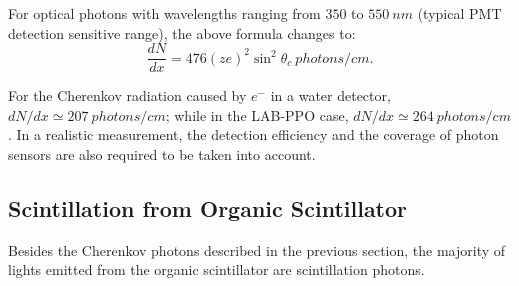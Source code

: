 For optical photons with wavelengths ranging from $350$ to $550~nm$ (typical PMT detection sensitive range), the above formula changes to\cite{leo2012techniques}:
\begin{equation}
\frac{dN}{dx}=476(ze)^2\sin^2\theta_c~photons/cm.
\end{equation}

For the Cherenkov radiation caused by $e^-$ in a water detector, $dN/dx \simeq 207~photons/cm$; while in the LAB-PPO case, $dN/dx \simeq 264~photons/cm$. In a realistic measurement, the detection efficiency and the coverage of photon sensors are also required to be taken into account.

\subsection{Scintillation from Organic Scintillator}\label{sect:scintillator}

Besides the Cherenkov photons described in the previous section, the majority of lights emitted from the organic scintillator are scintillation photons.


